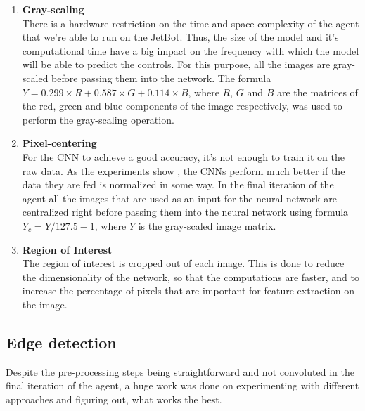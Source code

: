 \begin{enumerate}
  \item \textbf{Gray-scaling} \\
    There is a hardware restriction on the time and space complexity of the agent that we're able to run on the JetBot. Thus, the size of the model and it's computational time have a big impact on the frequency with which the model will be able to predict the controls. For this purpose, all the images are gray-scaled before passing them into the network. The formula $Y = 0.299 \times R + 0.587 \times G + 0.114 \times B$, where $R$, $G$ and $B$ are the matrices of the red, green and blue components of the image respectively, was used to perform the gray-scaling operation.
  \item \textbf{Pixel-centering} \\
    For the CNN to achieve a good accuracy, it's not enough to train it on the raw data. As the experiments show \autocite{pal2016preprocessing}, the CNNs perform much better if the data they are fed is normalized in some way. In the final iteration of the agent all the images that are used as an input for the neural network are centralized right before passing them into the neural network using formula $Y_c = Y / 127.5 - 1$, where $Y$ is the gray-scaled image matrix.
  \item \textbf{Region of Interest} \\
    The region of interest  is cropped out of each image. This is done to reduce the dimensionality of the network, so that the computations are faster, and to increase the percentage of pixels that are important for feature extraction on the image.
\end{enumerate}

\subsection{Edge detection}

Despite the pre-processing steps being straightforward and not convoluted in the final iteration of the agent, a huge work was done on experimenting with different approaches and figuring out, what works the best.

